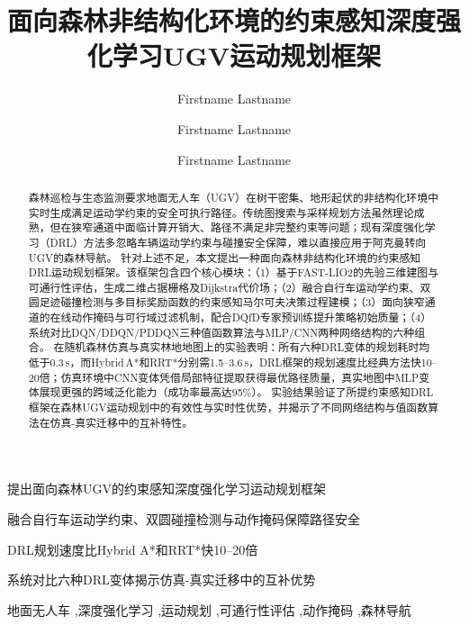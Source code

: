 \documentclass[twocolumn]{elsarticle}
\begin{document}
\begin{frontmatter}

\title{面向森林非结构化环境的约束感知深度强化学习UGV运动规划框架}

\author[1]{Firstname Lastname}
\author[2]{Firstname Lastname}
\author[2]{Firstname Lastname}

\address[1]{Affiliation 1}
\address[2]{Affiliation 2}

\begin{highlights}
\item 提出面向森林UGV的约束感知深度强化学习运动规划框架
\item 融合自行车运动学约束、双圆碰撞检测与动作掩码保障路径安全
\item DRL规划速度比Hybrid A*和RRT*快10--20倍
\item 系统对比六种DRL变体揭示仿真-真实迁移中的互补优势
\end{highlights}

\begin{abstract}
森林巡检与生态监测要求地面无人车（UGV）在树干密集、地形起伏的非结构化环境中实时生成满足运动学约束的安全可执行路径。传统图搜索与采样规划方法虽然理论成熟，但在狭窄通道中面临计算开销大、路径不满足非完整约束等问题；现有深度强化学习（DRL）方法多忽略车辆运动学约束与碰撞安全保障，难以直接应用于阿克曼转向UGV的森林导航。
针对上述不足，本文提出一种面向森林非结构化环境的约束感知DRL运动规划框架。该框架包含四个核心模块：（1）基于FAST-LIO2的先验三维建图与可通行性评估，生成二维占据栅格及Dijkstra代价场；（2）融合自行车运动学约束、双圆足迹碰撞检测与多目标奖励函数的约束感知马尔可夫决策过程建模；（3）面向狭窄通道的在线动作掩码与可行域过滤机制，配合DQfD专家预训练提升策略初始质量；（4）系统对比DQN/DDQN/PDDQN三种值函数算法与MLP/CNN两种网络结构的六种组合。
在随机森林仿真与真实林地地图上的实验表明：所有六种DRL变体的规划耗时均低于0.3\,s，而Hybrid\,A*和RRT*分别需1.5--3.6\,s，DRL框架的规划速度比经典方法快10--20倍；仿真环境中CNN变体凭借局部特征提取获得最优路径质量，真实地图中MLP变体展现更强的跨域泛化能力（成功率最高达95\%）。
实验结果验证了所提约束感知DRL框架在森林UGV运动规划中的有效性与实时性优势，并揭示了不同网络结构与值函数算法在仿真-真实迁移中的互补特性。
\end{abstract}

\begin{keyword}
地面无人车 \sep 深度强化学习 \sep 运动规划 \sep 可通行性评估 \sep 动作掩码 \sep 森林导航
\end{keyword}

\end{frontmatter}
\end{document}
